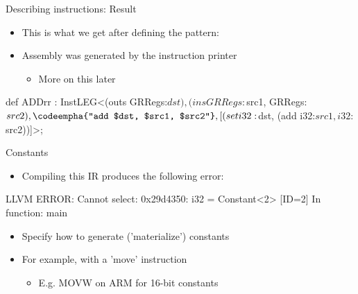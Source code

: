 \begin{frame}[fragile]{Describing instructions: Result}

\begin{itemize}
    \item This is what we get after defining the pattern:
    \item Assembly was generated by the instruction printer
    \begin{itemize}
        \item More on this later
    \end{itemize}
\end{itemize}


\begin{codebox}[commandchars=\\\{\}]
def ADDrr : InstLEG<(outs GRRegs:$dst),
                    (ins GRRegs:$src1, GRRegs:$src2),
                    \codeempha{"add $dst, $src1, $src2"},
                    [(set i32:$dst, (add i32:$src1, i32:$src2))]>;
\end{codebox}

\end{frame}


\begin{frame}[fragile]{Constants}

\begin{itemize}
    \item Compiling this IR produces the following error:
\end{itemize}

\begin{codebox}
\end{codebox}

\begin{codebox}
LLVM ERROR: Cannot select: 0x29d4350: i32 = Constant<2> [ID=2]
In function: main
\end{codebox}

\begin{itemize}
    \item Specify how to generate ('materialize') constants
    \item For example, with a 'move' instruction
    \begin{itemize}
        \item E.g. MOVW on ARM for 16-bit constants
    \end{itemize}
\end{itemize}

\end{frame}

